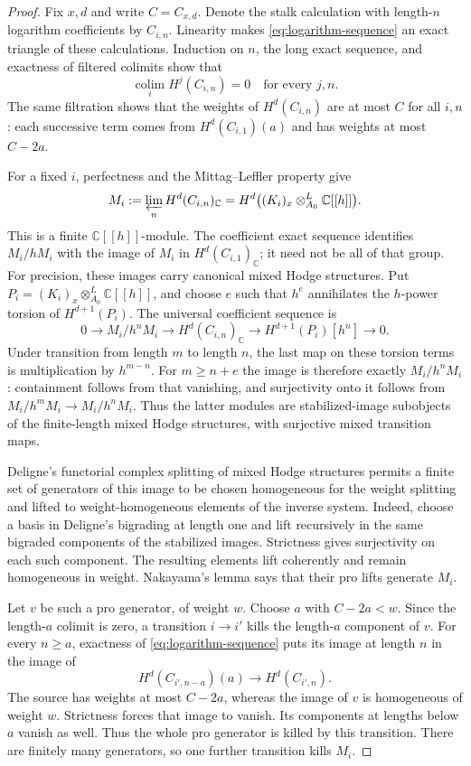 \begin{proof}
Fix $x,d$ and write $C=C_{x,d}$.  Denote the stalk calculation with
length-$n$ logarithm coefficients by $C_{i,n}$.
Linearity makes \eqref{eq:logarithm-sequence} an exact triangle of
these calculations.  Induction on $n$, the long exact sequence,
and exactness of filtered colimits show that
\[
 \operatorname*{colim}_i H^j(C_{i,n})=0
                  \quad\text{for every }j,n.
\]
The same filtration shows that the weights of $H^d(C_{i,n})$ are
at most $C$ for all $i,n$: each successive term comes from
$H^d(C_{i,1})(a)$ and has weights at most $C-2a$.

For a fixed $i$, perfectness and the Mittag--Leffler property give
\[
 M_i:=\varprojlim_n H^d(C_{i,n})_{\mathbb C}
   =H^d\bigl((K_i)_x\mathbin{\otimes}^{L}_{A_0}
                                             \mathbb C[[h]]\bigr).
\]
This is a finite $\mathbb C[[h]]$-module.  The coefficient exact
sequence identifies $M_i/hM_i$ with the image of $M_i$ in
$H^d(C_{i,1})_{\mathbb C}$; it need not be all of that group.
For precision, these images carry canonical mixed Hodge
structures.  Put
$P_i=(K_i)_x\otimes^L_{A_0}\mathbb C[[h]]$, and choose $e$
such that $h^e$ annihilates the $h$-power torsion of
$H^{d+1}(P_i)$.  The universal
coefficient sequence is
\[
 0\longrightarrow M_i/h^nM_i\longrightarrow
 H^d(C_{i,n})_{\mathbb C}\longrightarrow
 H^{d+1}(P_i)[h^n]\longrightarrow0.
\]
Under transition from length $m$ to length $n$, the last map
on these torsion terms is multiplication by $h^{m-n}$.
For $m\ge n+e$ the image is therefore exactly $M_i/h^nM_i$:
containment follows from that vanishing, and surjectivity
onto it follows from $M_i/h^mM_i\to M_i/h^nM_i$.
Thus the latter modules are stabilized-image subobjects of
the finite-length mixed Hodge structures, with surjective
mixed transition maps.

Deligne's functorial complex splitting of mixed Hodge structures
\cite{DeligneHodge} permits a finite set of generators of this
image to be chosen homogeneous for the weight splitting and
lifted to weight-homogeneous elements of the inverse system.
Indeed, choose a basis in Deligne's bigrading at length one
and lift recursively in the same bigraded components of
the stabilized images.  Strictness gives surjectivity on
each such component.  The resulting elements lift
coherently and remain homogeneous in weight.  Nakayama's
lemma says that their pro lifts generate $M_i$.

Let $v$ be such a pro generator, of weight $w$.  Choose $a$ with
$C-2a<w$.  Since the length-$a$ colimit is zero, a transition
$i\to i'$ kills the length-$a$ component of $v$.  For every
$n\ge a$, exactness of \eqref{eq:logarithm-sequence} puts its
image at length $n$ in the image of
\[
                 H^d(C_{i',n-a})(a)
                       \longrightarrow H^d(C_{i',n}).
\]
The source has weights at most $C-2a$, whereas the image of $v$
is homogeneous of weight $w$.  Strictness forces that image to
vanish.  Its components at lengths below $a$ vanish as well.
Thus the whole pro generator is killed by this transition.
There are finitely many generators, so one further transition
kills $M_i$.


\end{proof}
